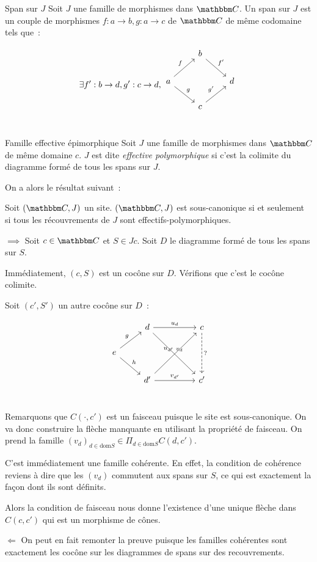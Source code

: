 \begin{defi}{Span sur $J$}
    Soit $J$ une famille de morphismes dans $\C$. Un span sur $J$ est un couple de
    morphismes $f:a\rightarrow b,g:a\rightarrow c$ de $\C$ de même codomaine tels que~:

    \[\exists f':b\rightarrow d, g':c\rightarrow d,\begin{tikzcd}
        & b \arrow[rd, "f'"] & \\
        a \arrow[ru, "f"] \arrow[rd, "g"] & & d \\
        & c \arrow[ru, "g'"] & \\
    \end{tikzcd}\]
\end{defi}

\begin{defi}{Famille effective épimorphique}
    Soit $J$ une famille de morphismes dans $\C$ de même domaine $c$. $J$ est dite
    \emph{effective polymorphique} si c'est la colimite du diagramme formé de tous
    les spans sur $J$.
\end{defi}

On a alors le résultat suivant~:

\begin{lem}
    Soit $(\C,J)$ un site. $(\C,J)$ est sous-canonique si et seulement si tous les
    récouvrements de $J$ sont effectifs-polymorphiques.
\end{lem}

\begin{pv}
    $\boxed{\implies}$ Soit $c\in \C$ et $S\in Jc$. Soit $D$ le diagramme formé
    de tous les spans sur $S$.

    Immédiatement, $(c,S)$ est un cocône sur $D$. Vérifions que c'est le cocône
    colimite.

    Soit $(c',S')$ un autre cocône sur $D$~:

    \[\begin{tikzcd}
        & d \arrow[rr, "u_d"] \arrow[rrdd, "v_d"] & & c \arrow[dd, dashed, "?"] \\
        e \arrow[ru, "g"] \arrow[rd, "h"] & & & \\
        & d' \arrow[rruu, "u_{d'}"] \arrow[rr, "v_{d'}"] & & c' \\
    \end{tikzcd}\]

    Remarquons que $C(\cdot, c')$ est un faisceau puisque le site est sous-canonique. On
    va donc construire la flèche manquante en utilisant la propriété de faisceau.
    On prend la famille $(v_d)_{d\in\text{dom}S}\in \Pi_{d\in\text{dom}S} C(d,c')$.
    
    C'est immédiatement une famille cohérente. En effet, la condition de cohérence
    reviens à dire que les $(v_d)$ commutent aux spans sur $S$, ce qui est exactement
    la façon dont ils sont définits.

    Alors la condition de faisceau nous donne l'existence d'une unique flèche dans
    $C(c,c')$ qui est un morphisme de cônes.

    $\boxed{\Longleftarrow}$ On peut en fait remonter la preuve puisque les familles 
    cohérentes sont exactement les cocône sur les diagrammes de spans sur des
    recouvrements.
\end{pv}

